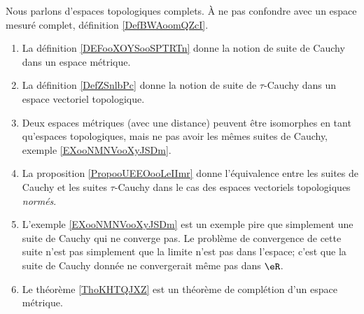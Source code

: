      \label{THMooOCXTooWenIJE}

Nous parlons d'espaces topologiques complets. À ne pas confondre avec un espace mesuré complet, définition \ref{DefBWAoomQZcI}.

\begin{enumerate}
    \item
        La définition \ref{DEFooXOYSooSPTRTn} donne la notion de suite de Cauchy dans un espace métrique.
    \item
        La définition \ref{DefZSnlbPc} donne la notion de suite de \( \tau\)-Cauchy dans un espace vectoriel topologique.
    \item
        Deux espaces métriques (avec une distance) peuvent être isomorphes en tant qu'espaces topologiques, mais ne pas avoir les mêmes suites de Cauchy, exemple \ref{EXooNMNVooXyJSDm}.
    \item
        La proposition \ref{PropooUEEOooLeIImr} donne l'équivalence entre les suites de Cauchy et les suites \( \tau\)-Cauchy dans le cas des espaces vectoriels topologiques \emph{normés}.
    \item
        L'exemple \ref{EXooNMNVooXyJSDm} est un exemple pire que simplement une suite de Cauchy qui ne converge pas. Le problème de convergence de cette suite n'est pas simplement que la limite n'est pas dans l'espace; c'est que la suite de Cauchy donnée ne convergerait même pas dans \( \eR\).
    \item
        Le théorème \ref{ThoKHTQJXZ} est un théorème de complétion d'un espace métrique.
\end{enumerate}

